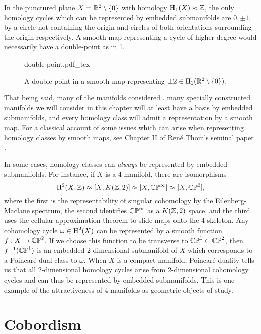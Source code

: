 \begin{example}
	In the punctured plane $X=\mathbb{R}^2\setminus \{0\}$ with homology $\operatorname{H}_1(X)\approx \mathbb{Z}$, the only homology cycles which can be represented by embedded submanifolds are $0,\pm 1$, by a circle not containing the origin and circles of both orientations surrounding the origin respectively. A smooth map representing a cycle of higher degree would necessarily have a double-point as in \cref{fig:double-point}.
\end{example}

\begin{figure}[ht]
	\centering
	{double-point.pdf_tex}
	\caption{A double-point in a smooth map representing $\pm 2\in \operatorname{H}_1(\mathbb{R}^2\setminus\{0\})$.}\label{fig:double-point}
\end{figure}

That being said, many of the manifolds considered .
many specially constructed manifolds we will consider in this chapter will at least have a basis by embedded submanifolds, and every homology class will admit a representation by a smooth map. For a classical account of some issues which can arise when representing homology classes by smooth maps, see Chapter II of Ren\'e Thom's seminal paper \cite{thom1954}.

\begin{remark}
	In some cases, homology classes can \emph{always} be represented by embedded submanifolds. For instance, if $X$ is a $4$-manifold, there are isomorphisms
	\[
		\operatorname{H}^2(X; \mathbb{Z}) \approx [X, K(\mathbb{Z},2)] \approx [X, \mathbb{CP}^\infty] \approx [X,\mathbb{CP}^2],
	\]
	where the first is the representability of singular cohomology by the Eilenberg-Maclane spectrum, the second identifies $\mathbb{CP}^\infty$ as a $K(\mathbb{Z},2)$ space, and the third uses the cellular approximation theorem to slide maps onto the $4$-skeleton. Any cohomology cycle $\omega\in \operatorname{H}^2(X)$ can be represented by a smooth function $f : X \to \mathbb{CP}^2$. If we choose this function to be transverse to $\mathbb{CP}^1\subset \mathbb{CP}^2$, then $f^{-1}(\mathbb{CP}^1)$ is an embedded $2$-dimensional submanifold of $X$ which corresponds to a Poincar\'e dual class to $\omega$. When $X$ is a compact manifold, Poincar\'e duality tells us that all $2$-dimensional homology cycles arise from $2$-dimensional cohomology cycles and can thus be represented by embedded submanifolds. This is one example of the attractiveness of $4$-manifolds as geometric objects of study.
\end{remark}

\section{Cobordism}\label{sec:cobordism}

